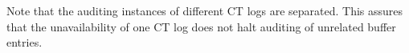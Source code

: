Note that the auditing instances of different CT logs are separated.  This
assures that the unavailability of one CT log does not halt auditing of
unrelated buffer entries.

